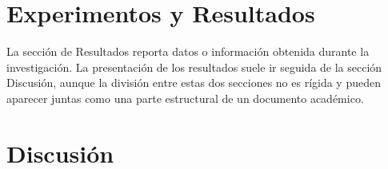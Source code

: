 \section{Experimentos y Resultados}
La sección de Resultados reporta datos o información obtenida  durante la investigación.
La presentación de los resultados suele ir seguida de la sección Discusión, aunque la división entre estas dos secciones no es rígida y pueden aparecer juntas como una parte estructural de un documento académico.

\section{Discusión}
